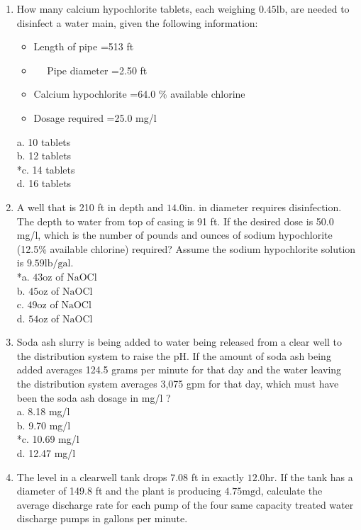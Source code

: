 \begin{enumerate}
\item How many calcium hypochlorite tablets, each weighing $0.45 \mathrm{lb}$, are needed to disinfect a water main, given the following information:\\
\begin{itemize}
\item Length of pipe =513 ft\\
\item $\quad$ Pipe diameter =2.50 ft\\
\item Calcium hypochlorite =64.0 \% available chlorine\\
\item Dosage required =25.0 mg/l\\
  \end{itemize}
a. 10 tablets\\
b. 12 tablets\\
*c. 14 tablets\\
d. 16 tablets \\
\item A well that is 210 ft in depth and $14.0 \mathrm{in}$. in diameter requires disinfection. The depth to water from top of casing is 91 ft. If the desired dose is 50.0 mg/l, which is the number of pounds and ounces of sodium hypochlorite (12.5\% available chlorine) required? Assume the sodium hypochlorite solution is $9.59 \mathrm{lb} / \mathrm{gal}$.\\
*a. $43 \mathrm{oz}$ of $\mathrm{NaOCl}$\\
b. $45 \mathrm{oz}$ of $\mathrm{NaOCl}$\\
c. $49 \mathrm{oz}$ of $\mathrm{NaOCl}$\\
d. $54 \mathrm{oz}$ of $\mathrm{NaOCl}$\\
\item Soda ash slurry is being added to water being released from a clear well to the distribution system to raise the pH. If the amount of soda ash being added averages 124.5 grams per minute for that day and the water leaving the distribution system averages 3,075 gpm for that day, which must have been the soda ash dosage in mg/l ?\\
a. 8.18 mg/l\\
b. 9.70 mg/l\\
*c. 10.69 mg/l\\
d. 12.47 mg/l\\
\item The level in a clearwell tank drops 7.08 ft in exactly $12.0 \mathrm{hr}$. If the tank has a diameter of 149.8 ft and the plant is producing $4.75 \mathrm{mgd}$, calculate the average discharge rate for each pump of the four same capacity treated water discharge pumps in gallons per minute.\\

\end{enumerate}
